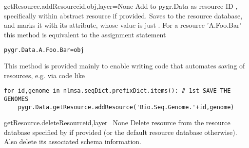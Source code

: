 \documentclass{howto}
\begin{document}
\begin{funcdesc}{getResource.addResource}{id,obj,layer=None}
  Add  to pygr.Data as resource ID , specifically within
  abstract resource  if provided.  Saves  to 
  the resource database, and marks it with its 
  attribute, whose value is just .  For a resource  'A.Foo.Bar'
  this method is equivalent to the assignment statement
\begin{verbatim}
pygr.Data.A.Foo.Bar=obj
\end{verbatim}
  This method is provided mainly to enable writing code that automates
  saving of resources, e.g. via code like
\begin{verbatim}
for id,genome in nlmsa.seqDict.prefixDict.items(): # 1st SAVE THE GENOMES
    pygr.Data.getResource.addResource('Bio.Seq.Genome.'+id,genome)
\end{verbatim}
\end{funcdesc}

\begin{funcdesc}{getResource.deleteResource}{id,layer=None}
  Delete resource  from the resource database specified by
   if provided (or the default resource database otherwise).
  Also delete its associated schema information.
\end{funcdesc}
\end{document}
